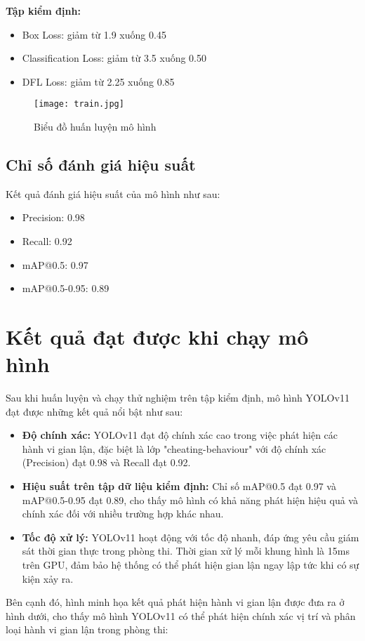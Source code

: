 \documentclass[conference]{IEEEtran}
\begin{document}
\textbf{Tập kiểm định:}
\begin{itemize}
    \item Box Loss: giảm từ 1.9 xuống 0.45
    \item Classification Loss: giảm từ 3.5 xuống 0.50
    \item DFL Loss: giảm từ 2.25 xuống 0.85
\end{itemize}
\begin{figure}[h]
    \centering
    \texttt{[image: train.jpg]}
    \caption{Biểu đồ huấn luyện mô hình}
    \label{fig:yolov11_architecture}
\end{figure}
\subsection{Chỉ số đánh giá hiệu suất}
Kết quả đánh giá hiệu suất của mô hình như sau:
\begin{itemize}
    \item Precision: 0.98
    \item Recall: 0.92
    \item mAP@0.5: 0.97
    \item mAP@0.5-0.95: 0.89
\end{itemize}
\section{Kết quả đạt được khi chạy mô hình}

Sau khi huấn luyện và chạy thử nghiệm trên tập kiểm định, mô hình YOLOv11 đạt được những kết quả nổi bật như sau:

\begin{itemize}
    \item \textbf{Độ chính xác:} YOLOv11 đạt độ chính xác cao trong việc phát hiện các hành vi gian lận, đặc biệt là lớp "cheating-behaviour" với độ chính xác (Precision) đạt 0.98 và Recall đạt 0.92.
    \item \textbf{Hiệu suất trên tập dữ liệu kiểm định:} Chỉ số mAP@0.5 đạt 0.97 và mAP@0.5-0.95 đạt 0.89, cho thấy mô hình có khả năng phát hiện hiệu quả và chính xác đối với nhiều trường hợp khác nhau.
    \item \textbf{Tốc độ xử lý:} YOLOv11 hoạt động với tốc độ nhanh, đáp ứng yêu cầu giám sát thời gian thực trong phòng thi. Thời gian xử lý mỗi khung hình là 15ms trên GPU, đảm bảo hệ thống có thể phát hiện gian lận ngay lập tức khi có sự kiện xảy ra.
\end{itemize}

Bên cạnh đó, hình minh họa kết quả phát hiện hành vi gian lận được đưa ra ở hình dưới, cho thấy mô hình YOLOv11 có thể phát hiện chính xác vị trí và phân loại hành vi gian lận trong phòng thi:
\end{document}
